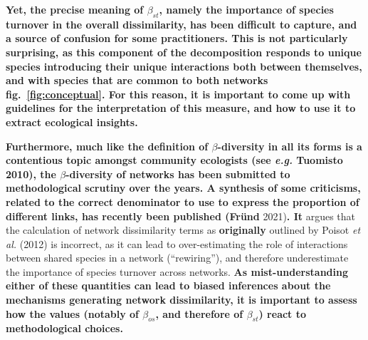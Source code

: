 \documentclass[11pt]{article}
\makeatletter
\def\maxwidth{\ifdim\Gin@nat@width>\linewidth\linewidth
\else\Gin@nat@width\fi}
\let\Oldincludegraphics\includegraphics
\renewcommand{\includegraphics}[1]{\Oldincludegraphics[width=\maxwidth]{#1}}
\providecommand{\DIFaddtex}[1]{{\bf #1}} %
\providecommand{\DIFaddbegin}{\protect\color{blue}} %
\providecommand{\DIFaddend}{\protect\color{black}} %
\providecommand{\DIFadd}[1]{\texorpdfstring{\DIFaddtex{#1}}{#1}} %
\newcommand{\DIFaddincludegraphics}[2][]{{\color{blue}\fbox{\DIFOincludegraphics[#1]{#2}}}} %
\DeclareRobustCommand{\DIFaddbegin}{\DIFOaddbegin \let\includegraphics\DIFaddincludegraphics} %
\DeclareRobustCommand{\DIFaddend}{\DIFOaddend \let\includegraphics\DIFOincludegraphics} %
\makeatother
\begin{document}
\DIFadd{Yet, the precise meaning of \(\beta_{st}\), namely the importance of
species turnover in the overall dissimilarity, has been difficult to
capture, and a source of confusion for some practitioners. This is not
particularly surprising, as this component of the decomposition responds
to unique species introducing their unique interactions both between
themselves, and with species that are common to both networks
fig.~\ref{fig:conceptual}. For this reason, it is important to come up
with guidelines for the interpretation of this measure, and how to use
it to extract ecological insights.
}

\DIFadd{Furthermore, much like the definition of \(\beta\)-diversity in all its
forms is a contentious topic amongst community ecologists (see
\emph{e.g.} Tuomisto 2010), the \(\beta\)-diversity of networks has been
submitted to methodological scrutiny over the years. A synthesis of some
criticisms, related to the correct denominator to use to express the
proportion of different links, has recently been published (Fründ }\DIFaddend 2021)\DIFaddbegin \DIFadd{.
It }\DIFaddend argues that the calculation of network dissimilarity terms as
\DIFaddbegin \DIFadd{originally }\DIFaddend outlined by Poisot \emph{et al.} (2012) is incorrect, as it
can lead to over-estimating the role of interactions between shared
species in a network (``rewiring''), and therefore underestimate the
importance of species turnover across networks. \DIFaddbegin \DIFadd{As mist-understanding
either of these quantities can lead to biased inferences about the
mechanisms generating network dissimilarity, it is important to assess
how the values (notably of \(\beta_{os}\), and therefore of
\(\beta_{st}\)) react to methodological choices.
}
\end{document}
